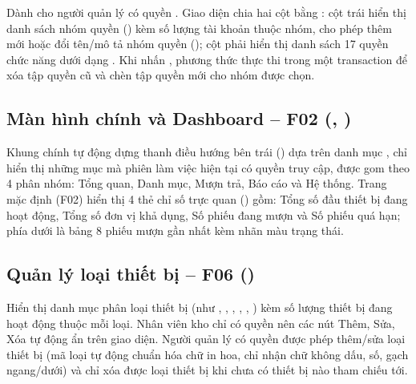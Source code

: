 Dành cho người quản lý có quyền . Giao diện chia hai cột bằng : cột trái hiển thị danh sách nhóm quyền () kèm số lượng tài khoản thuộc nhóm, cho phép thêm mới hoặc đổi tên/mô tả nhóm quyền (); cột phải hiển thị danh sách 17 quyền chức năng dưới dạng . Khi nhấn , phương thức  thực thi trong một transaction để xóa tập quyền cũ và chèn tập quyền mới cho nhóm được chọn.


\subsection{Màn hình chính và Dashboard – F02 (\texorpdfstring{}{MainForm.cs}, \texorpdfstring{}{DashboardPage.cs})}

Khung chính  tự động dựng thanh điều hướng bên trái () dựa trên danh mục , chỉ hiển thị những mục mà phiên làm việc hiện tại có quyền truy cập, được gom theo 4 phân nhóm: Tổng quan, Danh mục, Mượn trả, Báo cáo và Hệ thống. Trang mặc định  (F02) hiển thị 4 thẻ chỉ số trực quan () gồm: Tổng số đầu thiết bị đang hoạt động, Tổng số đơn vị khả dụng, Số phiếu đang mượn và Số phiếu quá hạn; phía dưới là bảng 8 phiếu mượn gần nhất kèm nhãn màu trạng thái.


\subsection{Quản lý loại thiết bị – F06 (\texorpdfstring{}{CategoryPage.cs})}

Hiển thị danh mục phân loại thiết bị (như , , , , , ) kèm số lượng thiết bị đang hoạt động thuộc mỗi loại. Nhân viên kho chỉ có quyền  nên các nút Thêm, Sửa, Xóa tự động ẩn trên giao diện. Người quản lý có quyền  được phép thêm/sửa loại thiết bị (mã loại tự động chuẩn hóa chữ in hoa, chỉ nhận chữ không dấu, số, gạch ngang/dưới) và chỉ xóa được loại thiết bị khi chưa có thiết bị nào tham chiếu tới.


